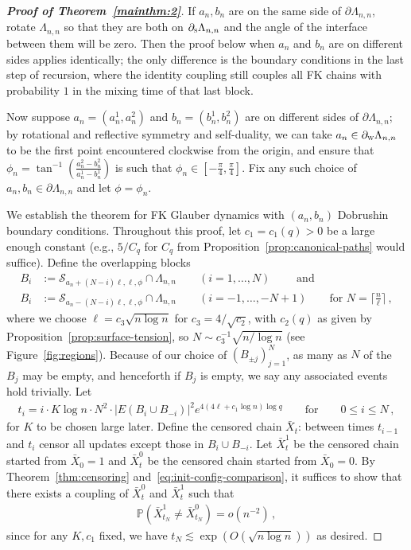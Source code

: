 \documentclass[reqno,11pt]{amsart}
\numberwithin{equation}{section}
\theoremstyle{definition}{
\newtheorem{example}[theorem]{Example}
\newtheorem{definition}[theorem]{Definition}
\newtheorem*{definition*}{Definition}
\newtheorem{problem}[theorem]{Problem}
\newtheorem{question}[theorem]{Question}
\newtheorem{remark}[theorem]{Remark}
}
\newcommand{\cS}{\ensuremath{\mathcal S}}
\newcommand{\south}{{\textsc{s}}}
\newcommand{\west}{{\textsc{w}}}
\begin{document}
\begin{proof}[\textbf{\emph{Proof of Theorem~\ref{mainthm:2}}}]
If $a_n,b_n$ are on the same side of $\partial \Lambda_{n,n}$, rotate $\Lambda_{n,n}$ so that they are both on $\partial_\south \Lambda_{n,n}$ and the angle of the interface between them will be zero. Then the proof below when $a_n$ and $b_n$ are on different sides applies identically; the only difference is the boundary conditions in the last step of recursion, where the identity coupling still couples all FK chains with probability $1$ in the mixing time of that last block.

Now suppose $a_n= (a_n^1,a_n^2)$ and $b_n= (b_n^1,b_n^2)$ are on different sides of $\partial \Lambda_{n,n}$; by rotational and reflective symmetry and self-duality, we can take $a_n\in \partial_\west \Lambda_{n,n}$ to be the first point encountered clockwise from the origin, and ensure that $\phi_n= \tan^{-1} (\frac {a_n^2 - b_n^2}{a_n^1-b_n^1})$ is such that $\phi_n \in [-\frac \pi 4,\frac \pi 4]$. Fix any such choice of $a_n,b_n\in \partial \Lambda_{n,n}$ and let $\phi=\phi_n$.

We establish the theorem for FK Glauber dynamics with $(a_n,b_n)$ Dobrushin boundary conditions. Throughout this proof, let $c_1=c_1(q)>0$ be a  large enough constant (e.g., $5/C_q$ for $C_q$ from Proposition~\ref{prop:canonical-paths} would suffice).
Define the overlapping blocks
\begin{align*}
B_i &:= \cS_{{a_n}+{(N-i)\ell},\ell,\phi}\cap \Lambda_{n,n} \qquad(i=1,\ldots , N)\qquad\mbox{ and}\\
B_i &:= \cS_{{a_n}-{(N-i)\ell},\ell,\phi}\cap \Lambda_{n,n} \qquad(i=-1,\ldots , -N+1)\qquad\mbox{for $N=\big\lceil\tfrac {n}{\ell}\big\rceil$}\,,
\end{align*}
where we choose $\ell=c_3\sqrt {n\log n}$ for $c_3=4/\sqrt{c_2}$, with $c_2(q)$ as given by Proposition~\ref{prop:surface-tension},
so $N\sim c_3^{-1}\sqrt{n/\log n}$ (see Figure~\ref{fig:regions}).
Because of our choice of $(B_{\pm j})_{j=1}^N$, as many as $N$ of the $B_j$ may be empty, and henceforth if $B_j$ is empty, we say any associated events hold trivially. 
Let 
\begin{align*}
t_i = i \cdot K \log n \cdot N^2 \cdot |E(B_i\cup B_{-i})|^2 e^{4(4\ell + c_1\log n) \log q} \qquad \mbox{for} \qquad 0\leq i \leq N\,,
\end{align*} 
for $K$ to be chosen large later.
Define the censored chain $\bar X_t$: between times $t_{i-1}$ and $t_{i}$ censor all updates except those in $B_{i}\cup B_{-i}$. Let $\bar X_t^1$ be the censored chain started from $\bar X_0 =1$ and $\bar X_t^0$ be the censored chain started from $\bar X_0= 0$. By Theorem~\ref{thm:censoring} and~\eqref{eq:init-config-comparison}, it suffices to show that there exists a coupling of $\bar X_t^0$ and $\bar X_t^1$ such that
\begin{align}
\mathbb P(\bar X_{t_{N}}^1\neq \bar X_{t_{N}}^0) = o(n^{-2})\,,
\end{align}
since for any $K, c_1$ fixed, we have $t_{N} \lesssim \exp(O(\sqrt{n\log n}))$ as desired. 



\end{proof}
\end{document}
